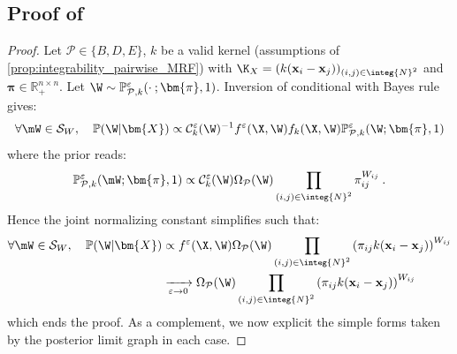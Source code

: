 \subsection{Proof of }
\label{proof:posterior_limit}

\posteriorW

\begin{proof}
Let $\mathcal{P} \in \{B, D, E\}$, $k$ be a valid kernel (assumptions of \cref{prop:integrability_pairwise_MRF}) with $\K_{X} = (k(\mathbf{x}_{i} - \mathbf{x}_{j}))_{(i,j) \in \integ{N}^2}$ and $\bm{\pi} \in \mathbb{R}_+^{n \times n}$. Let $\W \sim \mathbb{P}_{\mathcal{P},k}^{\varepsilon}(\cdot \: ; \bm{\pi},1)$. Inversion of conditional with Bayes rule gives:
\begin{align}
    \forall \mW \in \mathcal{S}_{W}, \quad \mathbb{P}(\W | \bm{X}) \propto
    \mathcal{C}_{k}^{\varepsilon}(\W)^{-1} f^{\varepsilon}(\X, \W) f_{k}(\X, \W) \mathbb{P}^{\varepsilon}_{\mathcal{P},k}(\W; \bm{\pi}, 1) \label{inversion_Conditional}
\end{align}
where the prior reads:
\begin{align}
    \mathbb{P}_{\mathcal{P},k}^{\varepsilon}(\mW; \bm{\pi}, 1) \propto \mathcal{C}^{\varepsilon}_k(\W) \Omega_{\mathcal{P}}(\W) \prod_{(i,j) \in \integ{N}^2} \pi_{ij}^{W_{ij}} \:.
\end{align}
Hence the joint normalizing constant simplifies such that:
\begin{align}
    \forall \mW \in \mathcal{S}_{W}, \quad \mathbb{P}(\W | \bm{X}) &\propto
    f^{\varepsilon}(\X, \W) \Omega_{\mathcal{P}}(\W) \prod_{(i,j) \in \integ{N}^2} \left(\pi_{ij} k(\mathbf{x}_i - \mathbf{x}_j)\right)^{W_{ij}} \\
    &\xrightarrow[\varepsilon \to 0]{} \Omega_{\mathcal{P}}(\W) \prod_{(i,j) \in \integ{N}^2}  \left(\pi_{ij} k(\mathbf{x}_i - \mathbf{x}_j)\right)^{W_{ij}}
\end{align}
which ends the proof. As a complement, we now explicit the simple forms taken by the posterior limit graph in each case.


\end{proof}
